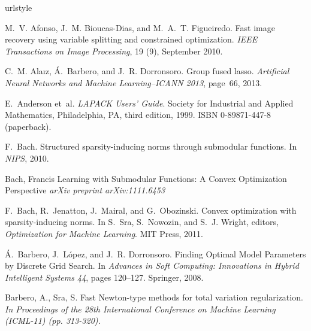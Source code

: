 \documentclass[twoside,11pt]{article}
\numberwithin{equation}{section}
\numberwithin{theorem}{section}
\begin{document}

\setlength{\bibsep}{1pt}
%
\begin{thebibliography}{86}
\providecommand{\natexlab}[1]{#1}
\providecommand{\url}[1]{\texttt{#1}}
\expandafter\ifx\csname urlstyle\endcsname\relax
  \providecommand{\doi}[1]{doi: #1}\else
  \providecommand{\doi}{doi: \begingroup \urlstyle{rm}\Url}\fi

M.~V. Afonso, J.~M. Bioucas-Dias, and M.~A.~T. Figueiredo.
\newblock Fast image recovery using variable splitting and constrained
  optimization.
\newblock \emph{IEEE Transactions on Image Processing}, 19 (9),
  September 2010.

C.~M. Ala{\i}z, {\'A}.~Barbero, and J.~R. Dorronsoro.
\newblock Group fused lasso.
\newblock \emph{Artificial Neural Networks and Machine Learning--ICANN 2013},
  page~66, 2013.

E.~Anderson et~al.
\newblock \emph{{LAPACK} Users' Guide}.
\newblock Society for Industrial and Applied Mathematics, Philadelphia, PA,
  third edition, 1999.
\newblock ISBN 0-89871-447-8 (paperback).

F.~Bach.
\newblock Structured sparsity-inducing norms through submodular functions.
\newblock In \emph{NIPS}, 2010.

Bach, Francis
\newblock Learning with Submodular Functions: A Convex Optimization Perspective
\newblock \emph{arXiv preprint arXiv:1111.6453}

F.~Bach, R.~Jenatton, J.~Mairal, and G.~Obozinski.
\newblock Convex optimization with sparsity-inducing norms.
\newblock In S.~Sra, S.~Nowozin, and S.~J. Wright, editors, \emph{Optimization
  for Machine Learning}. MIT Press, 2011.

{\'A}.~Barbero, J.~L{\'o}pez, and J.~R. Dorronsoro.
\newblock Finding {O}ptimal {M}odel {P}arameters by {D}iscrete {G}rid {S}earch.
\newblock In \emph{Advances in Soft Computing: Innovations in Hybrid
  Intelligent Systems 44}, pages 120--127. Springer, 2008.

Barbero, A., Sra, S.
\newblock Fast Newton-type methods for total variation regularization.
\newblock \emph{In Proceedings of the 28th International Conference on Machine Learning (ICML-11) (pp. 313-320).}


\end{thebibliography}
\end{document}
